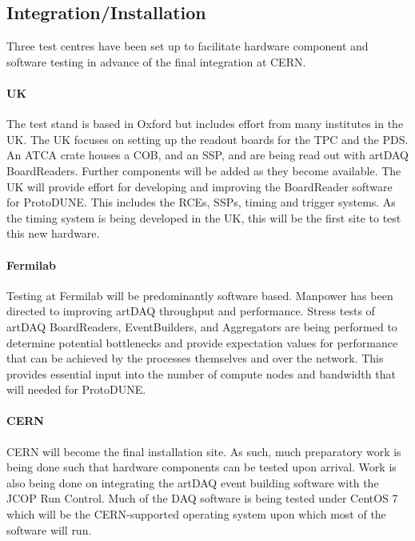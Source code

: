 \subsection{Integration/Installation}

Three test centres have been set up to facilitate hardware component and 
software testing in advance of the final integration at CERN.  
\paragraph{UK}
The test stand is based in Oxford but includes effort from many institutes 
in the UK.  The UK focuses on setting up the readout boards for the TPC and the 
PDS.  An ATCA crate houses a COB, and an SSP, and are being read out with
artDAQ BoardReaders.  Further components will be added as they become available.
The UK will provide effort for developing and improving
the BoardReader software for ProtoDUNE.  This includes the RCEs, SSPs, timing and
trigger systems.  As the timing system is being developed in the UK, this 
will be the first site to test this new hardware.
\paragraph{Fermilab}
Testing at Fermilab will be predominantly software based.  Manpower has been
directed to improving artDAQ throughput and performance.  Stress tests of artDAQ
BoardReaders, EventBuilders, and Aggregators are being performed to determine
potential bottlenecks and provide expectation values for performance that can be
achieved by the processes themselves and over the network.  This provides essential
input into the number of compute nodes and bandwidth that will needed for ProtoDUNE.
\paragraph{CERN}
CERN will become the final installation site.  As such, much preparatory work
is being done such that hardware components can be tested upon arrival.  Work is
also being done on integrating the artDAQ event building software with the JCOP
Run Control.  Much of the DAQ software is being tested under CentOS 7 which 
will be the CERN-supported operating system upon which most of the software will run.


